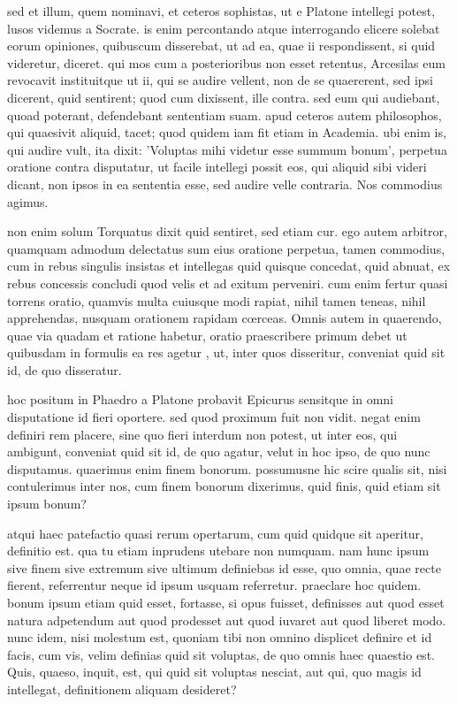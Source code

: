  sed et illum, quem nominavi, et ceteros sophistas, ut e Platone intellegi potest, lusos videmus a Socrate. is enim percontando atque interrogando elicere solebat eorum opiniones, quibuscum disserebat, ut ad ea, quae ii respondissent, si quid videretur, diceret. qui mos cum a posterioribus non esset retentus, Arcesilas eum revocavit instituitque ut ii, qui se audire vellent, non de se quaererent, sed ipsi dicerent, quid sentirent; quod cum dixissent, ille contra. sed eum qui audiebant, quoad poterant, defendebant sententiam suam. apud ceteros autem philosophos, qui quaesivit aliquid, tacet; quod quidem iam fit etiam in Academia. ubi enim is, qui audire vult, ita dixit: 'Voluptas mihi videtur esse summum bonum', perpetua oratione contra disputatur, ut facile intellegi possit eos, qui aliquid sibi videri dicant, non ipsos in ea sententia esse, sed audire velle contraria. Nos commodius agimus.

 non enim solum Torquatus dixit quid sentiret, sed etiam cur. ego autem arbitror, quamquam admodum delectatus sum eius oratione perpetua, tamen commodius, cum in rebus singulis insistas et intellegas quid quisque concedat, quid abnuat, ex rebus concessis concludi quod velis et ad exitum perveniri. cum enim fertur quasi torrens oratio, quamvis multa cuiusque modi rapiat, nihil tamen teneas, nihil apprehendas, nusquam orationem rapidam cœrceas. Omnis autem in quaerendo, quae via quadam et ratione habetur, oratio praescribere primum debet ut quibusdam in formulis ea res agetur , ut, inter quos disseritur, conveniat quid sit id, de quo disseratur.

 hoc positum in Phaedro a Platone probavit Epicurus sensitque in omni disputatione id fieri oportere. sed quod proximum fuit non vidit. negat enim definiri rem placere, sine quo fieri interdum non potest, ut inter eos, qui ambigunt, conveniat quid sit id, de quo agatur, velut in hoc ipso, de quo nunc disputamus. quaerimus enim finem bonorum. possumusne hic scire qualis sit, nisi contulerimus inter nos, cum finem bonorum dixerimus, quid finis, quid etiam sit ipsum bonum?

 atqui haec patefactio quasi rerum opertarum, cum quid quidque sit aperitur, definitio est. qua tu etiam inprudens utebare non numquam. nam hunc ipsum sive finem sive extremum sive ultimum definiebas id esse, quo omnia, quae recte fierent, referrentur neque id ipsum usquam referretur. praeclare hoc quidem. bonum ipsum etiam quid esset, fortasse, si opus fuisset, definisses aut quod esset natura adpetendum aut quod prodesset aut quod iuvaret aut quod liberet modo. nunc idem, nisi molestum est, quoniam tibi non omnino displicet definire et id facis, cum vis, velim definias quid sit voluptas, de quo omnis haec quaestio est. Quis, quaeso, inquit, est, qui quid sit voluptas nesciat, aut qui, quo magis id intellegat, definitionem aliquam desideret?

